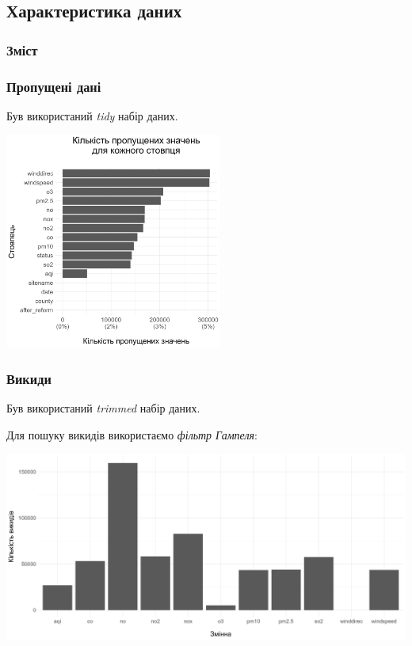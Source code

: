 \documentclass{beamer}
\begin{document}
\begin{frame}
  \section{Характеристика даних}

  \frametitle{Зміст}
  \tableofcontents[currentsection]
\end{frame}

\begin{frame}
  \frametitle{Пропущені дані}

  Був використаний \textit{tidy} набір даних.

  \begin{center}
    \includegraphics[height=2.8in]{plots/missed_data.png}
  \end{center}
\end{frame}

\begin{frame}
  \frametitle{Викиди}

  Був використаний \textit{trimmed} набір даних.

  Для пошуку викидів використаємо \textit{фільтр Гампеля}:

  \includegraphics[width=\linewidth]{plots/outliers/count-bar.png}
\end{frame}
\end{document}
